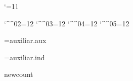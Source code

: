
\ifx\utfon\undefined  \fi

\catcode`\@=11

\catcode`\^^02=12 \catcode`\^^03=12 \catcode`\^^04=12 \catcode`\^^05=12


\newread\infile

\newif\ifauxf
\openin\infile=auxiliar.aux
\ifeof\infile \auxffalse \else \auxftrue \fi
\closein\infile

\newif\ifindf
\openin\infile=auxiliar.ind
\ifeof\infile \indffalse \else \indftrue \fi
\closein\infile


\ifx\pdfoutput\undefined \csname newcount\endcsname\pdfoutput \fi


\def\cmykWhite{0 0 0 0} \def\cmykDarkWhite{0 0 0 .3}
\def\cmykGray{0 0 0 .5} \def\cmykDarkGray{0 0 0 .7}
\def\cmykBlack{0 0 0 1} \def\cmykDarkBlack{.4 .3 .3 1}
\def\cmykYellow{0 0 1 0} \def\cmykDarkYellow{0 0 1 .7}
\def\cmykMagenta{0 1 0 0} \def\cmykDarkMagenta{0 1 0 .7}
\def\cmykCyan{1 0 0 0} \def\cmykDarkCyan{1 0 0 .7}
\def\cmykRed{0 1 1 0} \def\cmykDarkRed{0 1 1 .7}
\def\cmykGreen{1 0 1 0} \def\cmykDarkGreen{1 0 1 .7}
\def\cmykBlue{1 1 0 0} \def\cmykDarkBlue{1 1 0 .7}

\newcount\col@rstack
\def\pdf@color#1{\pdfcolorstack\col@rstack push {\csname cmyk#1\endcsname k}}
 \def\pdf@darkcolor#1{\pdfcolorstack\col@rstack push {\csname cmykDark#1\endcsname k}}
 \def\pdf@endcolor{\pdfcolorstack\col@rstack pop}
 \def\pdf@black{\pdfcolorstack\col@rstack push {0 g}}
\def\dvips@color#1{\special{color push cmyk \csname cmyk#1\endcsname}}
 \def\dvips@darkcolor#1{\special{color push cmyk \csname cmykDark#1\endcsname}}
 \def\dvips@endcolor{\special{color pop}}
 \def\dvips@black{\special{color push gray 0}}
\def\dvipdf@color#1{\special{pdf: bc [\csname cmyk#1\endcsname]}}
 \def\dvipdf@darkcolor#1{\special{pdf: bc [\csname cmykDark#1\endcsname]}}
 \def\dvipdf@endcolor{\special{pdf: ec}}
 \def\dvipdf@black{\special{pdf: bc [0]}}

\def\pdf@background#1{\pdfliteral page {q \csname cmyk#1\endcsname k \csname cmyk#1\endcsname K
 -144 -144 m 864 -144 l 864 1080 l -144 1080 l b Q}}
\def\dvips@background#1{\special{background cmyk \csname cmyk#1\endcsname}}
\def\dvipdf@background#1{\special{pdf: bgc [\csname cmyk#1\endcsname]}}

